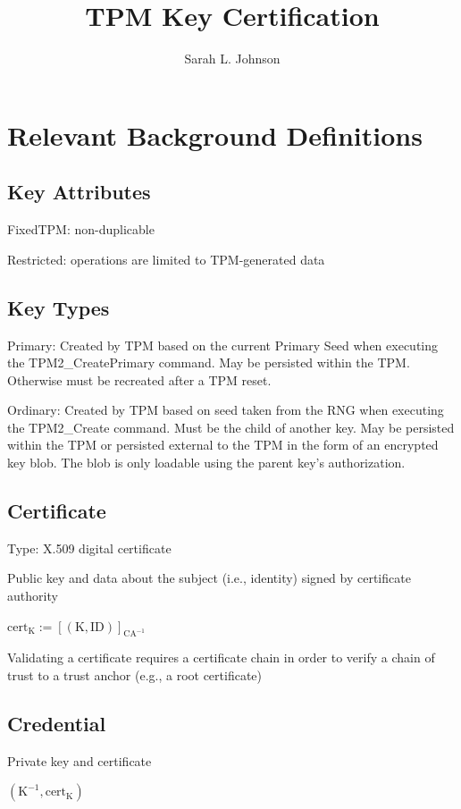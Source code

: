 \documentclass{article}
\title{TPM Key Certification}
\author{Sarah L. Johnson}
\begin{document}
\maketitle

\section*{Relevant Background Definitions}
\subsection*{Key Attributes}
FixedTPM: non-duplicable 

Restricted: operations are limited to TPM-generated data

\subsection*{Key Types}
Primary: Created by TPM based on the current Primary Seed when executing the TPM2\_CreatePrimary command. May be persisted within the TPM. Otherwise must be recreated after a TPM reset.

Ordinary: Created by TPM based on seed taken from the RNG when executing the TPM2\_Create command. Must be the child of another key. May be persisted within the TPM or persisted external to the TPM in the form of an encrypted key blob. The blob is only loadable using the parent key's authorization.

\subsection*{Certificate}
Type: X.509 digital certificate

Public key and data about the subject (i.e., identity) signed by certificate authority

$\text{cert}_{\text{K}} := [(\text{K}, \text{ID})]_{\text{CA}^{-1}}$

Validating a certificate requires a certificate chain in order to verify a chain of trust to a trust anchor (e.g., a root certificate)

\subsection*{Credential}
Private key and certificate

$(\text{K}^{-1}, \text{cert}_{\text{K}})$
\end{document}
